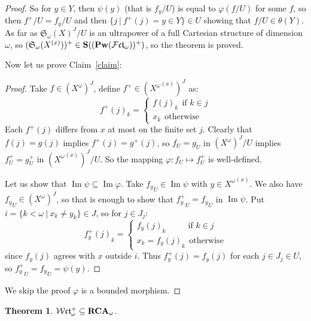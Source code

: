 \documentclass{article}
\theoremstyle{defin}
\theoremstyle{theorem}
\newtheorem{theorem}{Theorem}
\theoremstyle{claim}
\theoremstyle{prop}
\theoremstyle{lemma}
\theoremstyle{fact}
\theoremstyle{remark}
\theoremstyle{ex}
\theoremstyle{col}
\theoremstyle{question}
\begin{document}
\begin{proof}
So for $y \in Y$, then $\psi(y)$ (that is $f_y/U$) is equal to $\varphi(f/U)$ for some $f$, so then $f^+/U = f_y/U$ and then $\{ j \: | \: f^{+}(j) = y \in Y \} \in U$ showing that $f/U \in \theta(Y)$. As far as $\mathfrak{S}_{\omega}(X)^J/U$ is an ultrapower of a full Cartesian structure of dimension $\omega$, so $(\mathfrak{S}_{\omega}(X^{(x)}))^+ \in {\bf S} (({\bf Pw}(\mathcal{F}\mathfrak{ct}_{\omega}))^+)$, so the theorem is proved.

Now let us prove Claim~\ref{claim}:
\begin{proof}
Take $f \in (X^{\omega})^J$, define $f^{+} \in ({X^{\omega}}^{(x)})^J$ as:
\begin{equation}
    f^{+}(j)_k = \begin{cases}
        f(j)_k \:\: \text{if $k \in j$} \\
        x_k \:\: \text{otherwise}
    \end{cases}
\end{equation}
Each $f^+(j)$ differs from $x$ at most on the finite set $j$. Clearly that $f(j) = g(j)$ implies $f^+(j) = g^+(j)$, so $f_U = g_U$ in $(X^{\omega})^J/U$ implies $f^+_U = g^+_U$ in $({X^{\omega}}^{(x)})^J/U$. So the mapping $\varphi : f_U \mapsto f^+_U$ is well-defined.

Let us show that $\operatorname{Im}\psi \subseteq \operatorname{Im}\varphi$. Take ${f_y}_U \in \operatorname{Im}\psi$ with $y \in {X^{\omega}}^{(x)}$. We also have ${f_y}_U \in (X^{\omega})^J$, so that is enough to show that ${f^+_y}_U = {f_y}_U$ in $\operatorname{Im}\psi$. Put $i = \{ k < \omega \: | \: x_k \neq y_k \} \in J$, so for $j \in J_j$:
\begin{equation}
    {f^+_y(j)}_k = \begin{cases}
        {f_y(j)}_k \:\:\:\:\:\:\:\:\:\:\:\: \text{if $k \in j$} \\
        x_k = {f_y(j)}_k \:\: \text{otherwise}
    \end{cases}
\end{equation}
since $f_y(j)$ agrees with $x$ outside $i$. Thus $f^{+}_y(j) = f_y(j)$ for each $j \in J_j \in U$, so ${f^{+}_y}_U = {f_y}_U = \psi(y)$.
\end{proof}

We skip the proof $\varphi$ is a bounded morphism. 
\end{proof}

\begin{theorem}
$\mathcal{W}\mathfrak{ct}_{\omega}^+ \subseteq {\bf RCA}_{\omega}$.
\end{theorem}
\end{document}
